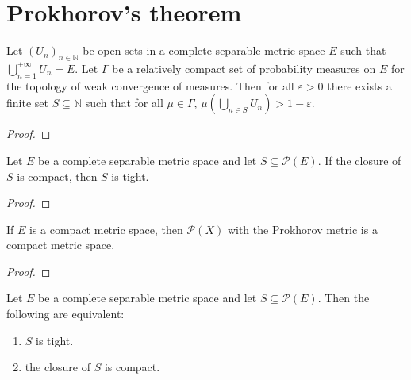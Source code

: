 \section{Prokhorov's theorem}

\begin{lemma}\label{lem:exists_finite_union_inter_lt}
Let $(U_n)_{n \in \mathbb{N}}$ be open sets in a complete separable metric space $E$ such that $\bigcup_{n=1}^{+ \infty} U_n = E$. Let $\Gamma$ be a relatively compact set of probability measures on $E$ for the topology of weak convergence of measures. Then for all $\varepsilon > 0$ there exists a finite set $S \subseteq \mathbb{N}$ such that for all $\mu \in \Gamma$, $\mu(\bigcup_{n \in S} U_n) > 1 - \varepsilon$.
\end{lemma}

\begin{proof}
\end{proof}

\begin{lemma}\label{lem:prokhorov_aux1}
Let $E$ be a complete separable metric space and let $S \subseteq \mathcal P(E)$. If the closure of $S$ is compact, then $S$ is tight.
\end{lemma}

\begin{proof}
\end{proof}

\begin{lemma}\label{ProbabilityMeasure_compact}
If $E$ is a compact metric space, then $\mathcal P(X)$ with the Prokhorov metric is a compact metric space.
\end{lemma}

\begin{proof}
\end{proof}

\begin{theorem}\label{thm:prokhorov}
Let $E$ be a complete separable metric space and let $S \subseteq \mathcal P(E)$. Then the following are equivalent:
\begin{enumerate}
	\item $S$ is tight.
	\item the closure of $S$ is compact.
\end{enumerate}
\end{theorem}

